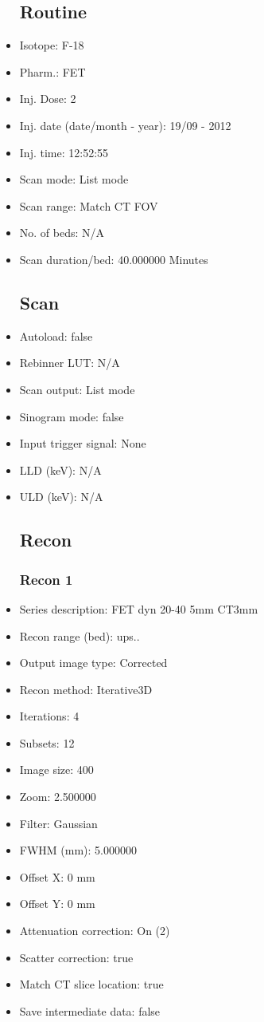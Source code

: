 \documentclass[12pt]{article}
\begin{document}
\begin{itemize}
\subsection{Routine}
\item Isotope: F-18
\item Pharm.: FET
\item Inj. Dose: 2 
\item Inj. date (date/month - year): 19/09 - 2012
\item Inj. time: 12:52:55
\item Scan mode: List mode
\item Scan range: Match CT FOV
\item No. of beds: N/A
\item Scan duration/bed: 40.000000 Minutes
\subsection{Scan}
\item Autoload: false
\item Rebinner LUT: N/A
\item Scan output: List mode
\item Sinogram mode: false
\item Input trigger signal: None
\item LLD (keV): N/A
\item ULD (keV): N/A
\subsection{Recon}

\subsubsection{Recon 1}
\item Series description: FET dyn 20-40 5mm CT3mm
\item Recon range (bed): ups..
\item Output image type: Corrected
\item Recon method: Iterative3D
\item Iterations: 4
\item Subsets: 12
\item Image size: 400
\item Zoom: 2.500000
\item Filter: Gaussian
\item FWHM (mm): 5.000000
\item Offset X: 0 mm
\item Offset Y: 0 mm
\item Attenuation correction: On (2)
\item Scatter correction: true
\item Match CT slice location: true
\item Save intermediate data: false

\end{itemize}
\end{document}
